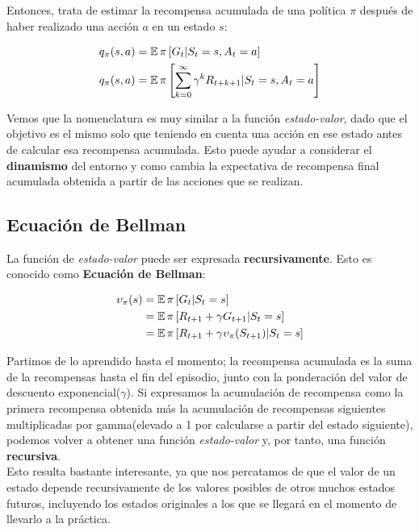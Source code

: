 \documentclass[11pt,fleqn]{book} %
\begin{document}
Entonces, trata de estimar la recompensa acumulada de una política $\pi$ después de haber realizado una acción $a$ en un estado $s$:

\begin{align*}
q_\pi(s,a)&=\operatorname*{\mathbb{E}}\pi\left[G_t|S_t=s,A_t=a\right]\\
q_\pi(s,a)&=\operatorname*{\mathbb{E}}\pi\left[\sum^\infty_{k=0}\gamma^kR_{t+k+1}|S_t=s,A_t=a\right]
\end{align*}

Vemos que la nomenclatura es muy similar a la función \textit{estado-valor}, dado que el objetivo es el mismo solo que teniendo en cuenta una acción en ese estado antes de calcular esa recompensa acumulada. Esto puede ayudar a considerar el \textbf{dinamismo} del entorno y como cambia la expectativa de recompensa final acumulada obtenida a partir de las acciones que se realizan.

\subsection{Ecuación de Bellman}\label{sec:bellman}

La función de \textit{estado-valor} puede ser expresada \textbf{recursivamente}. Esto es conocido como \textbf{Ecuación de Bellman}:

\begin{align*}
\upsilon_\pi(s)&=\operatorname*{\mathbb{E}}\pi\left[G_t|S_t=s\right] \\
&= \operatorname*{\mathbb{E}}\pi\left[R_{t+1}+\gamma G_{t+1}|S_t=s\right]\\
&= \operatorname*{\mathbb{E}}\pi\left[R_{t+1}+\gamma \upsilon_\pi(S_{t+1})|S_t=s\right]
\end{align*} 

Partimos de lo aprendido hasta el momento; la recompensa acumulada es la suma de la recompensas hasta el fin del episodio, junto con la ponderación del valor de descuento exponencial($\gamma$). Si expresamos la acumulación de recompensa como la primera recompensa obtenida más la acumulación de recompensas siguientes multiplicadas por gamma(elevado a 1 por calcularse a partir del estado siguiente), podemos volver a obtener una función \textit{estado-valor} y, por tanto, una función \textbf{recursiva}.\\

Esto resulta bastante interesante, ya que nos percatamos de que el valor de un estado depende recursivamente de los valores posibles de otros muchos estados futuros, incluyendo los estados originales a los que se llegará en el momento de llevarlo a la práctica. \\
\end{document}

